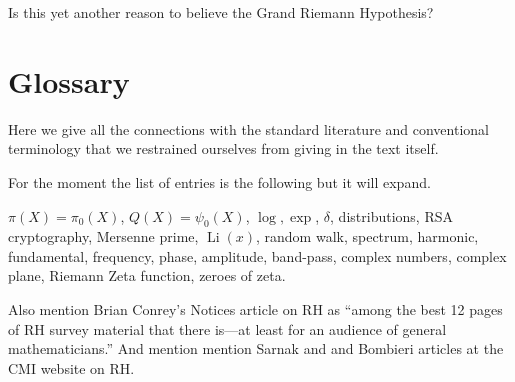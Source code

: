 \documentclass[openany]{book}
\DeclareMathOperator{\Li}{Li}
\theoremstyle{plain}
\theoremstyle{definition}
\begin{document}
Is this yet another reason to believe the Grand Riemann Hypothesis?



\chapter{Glossary}

Here we give all the connections with the standard literature and
conventional terminology that we restrained
  ourselves from giving in the text itself.

  For the moment the list of entries is the following but it will
  expand.

  $\pi(X)= \pi_0(X)$, $Q(X)= \psi_0(X)$, $\log, \exp$, $\delta$,
  distributions, RSA cryptography, Mersenne prime, $\Li(x)$, random
  walk, spectrum, harmonic, fundamental, frequency, phase, amplitude,
  band-pass, complex numbers, complex plane, Riemann Zeta function,
  zeroes of zeta.


  Also mention Brian Conrey's Notices article on RH as ``among the
  best 12 pages of RH survey material that there is---at least for an
  audience of general mathematicians.''  And mention
 mention Sarnak and and Bombieri articles at the CMI website on RH.


\backmatter




\renewcommand\bibname{Endnotes}


\end{document}
